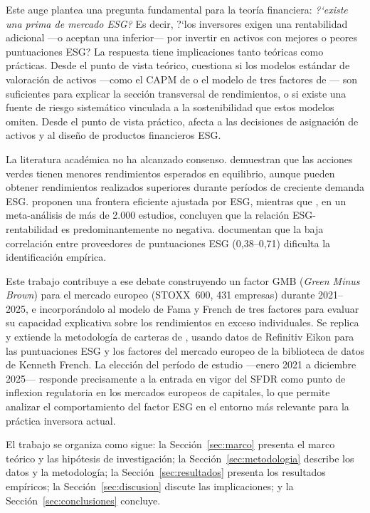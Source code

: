 \documentclass[12pt, a4paper]{article}
\begin{document}
Este auge plantea una pregunta fundamental para la teor\'ia financiera: \textit{?`existe
una prima de mercado ESG?} Es decir, ?`los inversores exigen una rentabilidad adicional
---o aceptan una inferior--- por invertir en activos con mejores o peores puntuaciones
ESG? La respuesta tiene implicaciones tanto te\'oricas como pr\'acticas. Desde el punto
de vista te\'orico, cuestiona si los modelos est\'andar de valoraci\'on de activos
---como el CAPM de \textcites{sharpe1964}{lintner1965} o el modelo de tres factores de
\textcite{famafrench1993}--- son suficientes para explicar la secci\'on transversal de
rendimientos, o si existe una fuente de riesgo sistem\'atico vinculada a la sostenibilidad
que estos modelos omiten. Desde el punto de vista pr\'actico, afecta a las decisiones
de asignaci\'on de activos y al dise\~no de productos financieros ESG.

La literatura acad\'emica no ha alcanzado consenso. \textcites{pastor2021}{pastor2022}
demuestran que las acciones verdes tienen menores rendimientos esperados en equilibrio,
aunque pueden obtener rendimientos realizados superiores durante per\'iodos de creciente
demanda ESG. \textcite{pedersen2021} proponen una frontera eficiente ajustada por ESG,
mientras que \textcite{friede2015}, en un meta-an\'alisis de m\'as de 2.000 estudios,
concluyen que la relaci\'on ESG-rentabilidad es predominantemente no negativa.
\textcite{bergkolbel2022} documentan que la baja correlaci\'on entre proveedores de
puntuaciones ESG (0,38--0,71) dificulta la identificaci\'on emp\'irica.

Este trabajo contribuye a ese debate construyendo un factor GMB (\textit{Green Minus
Brown}) para el mercado europeo (STOXX~600, 431 empresas) durante 2021--2025, e
incorpor\'andolo al modelo de Fama y French de tres factores para evaluar su capacidad
explicativa sobre los rendimientos en exceso individuales. Se replica y extiende la
metodolog\'ia de carteras de \textcite{famafrench1993}, usando datos de Refinitiv Eikon
para las puntuaciones ESG y los factores del mercado europeo de la biblioteca de datos
de Kenneth French. La elecci\'on del per\'iodo de estudio ---enero 2021 a diciembre
2025--- responde precisamente a la entrada en vigor del SFDR como punto de inflexion
regulatoria en los mercados europeos de capitales, lo que permite analizar el
comportamiento del factor ESG en el entorno m\'as relevante para la pr\'actica
inversora actual.

El trabajo se organiza como sigue: la Secci\'on~\ref{sec:marco} presenta el marco
te\'orico y las hip\'otesis de investigaci\'on; la Secci\'on~\ref{sec:metodologia}
describe los datos y la metodolog\'ia; la Secci\'on~\ref{sec:resultados} presenta
los resultados emp\'iricos; la Secci\'on~\ref{sec:discusion} discute las implicaciones;
y la Secci\'on~\ref{sec:conclusiones} concluye.
\end{document}
